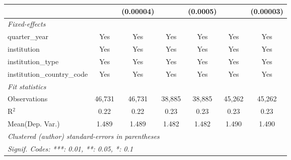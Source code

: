 \begin{tabular}{lcccccc}
                                      &               & (0.00004)     &               & (0.0005)      &               & (0.00003)\\   
   \midrule
   \emph{Fixed-effects}\\
   quarter\_year                      & Yes           & Yes           & Yes           & Yes           & Yes           & Yes\\  
   institution                        & Yes           & Yes           & Yes           & Yes           & Yes           & Yes\\  
   institution\_type                  & Yes           & Yes           & Yes           & Yes           & Yes           & Yes\\  
   institution\_country\_code         & Yes           & Yes           & Yes           & Yes           & Yes           & Yes\\  
   \midrule
   \emph{Fit statistics}\\
   Observations                       & 46,731        & 46,731        & 38,885        & 38,885        & 45,262        & 45,262\\  
   R$^2$                              & 0.22          & 0.22          & 0.23          & 0.23          & 0.23          & 0.23\\  
Mean(Dep. Var.) & 1.489 & 1.489 & 1.482 & 1.482 & 1.490 & 1.490 \\
   \midrule \midrule
   \multicolumn{7}{l}{\emph{Clustered (author) standard-errors in parentheses}}\\
   \multicolumn{7}{l}{\emph{Signif. Codes: ***: 0.01, **: 0.05, *: 0.1}}\\
\end{tabular}
\par\endgroup
